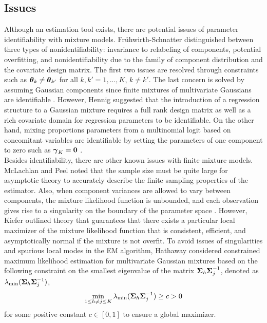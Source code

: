\subsection{Issues}
Although an estimation tool exists, there are potential issues of parameter identifiability with mixture models. Fr{\"u}hwirth-Schnatter \cite{fruhwirth2006} distinguished between three types of nonidentifiability: invariance to  relabeling of components, potential overfitting, and nonidentifiability due to the family of component distribution and the covariate design matrix. The first two issues are resolved through constraints such as $\boldsymbol\theta_{k}\not=\boldsymbol\theta_{k'}$ for all $k,k'=1,...,K$, $k\not=k'$. The last concern is solved by assuming Gaussian components since finite mixtures of multivariate Gaussians are identifiable \cite{teicher1963,yakowitz1968}. However, Hennig \cite{hennig2000} suggested that the introduction of a regression structure to a Gaussian mixture requires a full rank design matrix as well as a rich covariate domain for regression parameters to be identifiable. On the other hand, mixing proportions parameters from a multinomial logit based on concomitant variables are identifiable by setting the parameters of one component to zero such as $\boldsymbol\gamma_{K}=\boldsymbol0$ \cite{jiang1999}.\\

Besides identifiability, there are other known issues with finite mixture models. McLachlan and Peel \cite{mclachlan2000} noted that the sample size must be quite large for asymptotic theory to accurately describe the finite sampling properties of the estimator. Also, when component variances are allowed to vary between components, the mixture likelihood function is unbounded, and each observation gives rise to a singularity on the boundary of the parameter space \cite{day1969,kiefer1956}. However, Kiefer \cite{kiefer1978} outlined theory that guarantees that there exists a particular local maximizer of the mixture likelihood function that is consistent, efficient, and asymptotically normal if the mixture is not overfit. To avoid issues of singularities and spurious local modes in the EM algorithm, Hathaway \cite{hathaway1985} considered constrained maximum likelihood estimation for multivariate Gaussian mixtures based on the following constraint on the smallest eigenvalue of the matrix $\boldsymbol\Sigma_{h}\boldsymbol\Sigma_{j}^{-1}$, denoted as $\lambda_{\text{min}}(\boldsymbol\Sigma_{h}\boldsymbol\Sigma_{j}^{-1})$,
$$\min_{1\leq h\not=j\leq K}\lambda_{\text{min}}(\boldsymbol\Sigma_{h}\boldsymbol\Sigma_{j}^{-1})\geq c > 0$$ for some positive constant $c\in[0,1]$ to ensure a global maximizer. 


